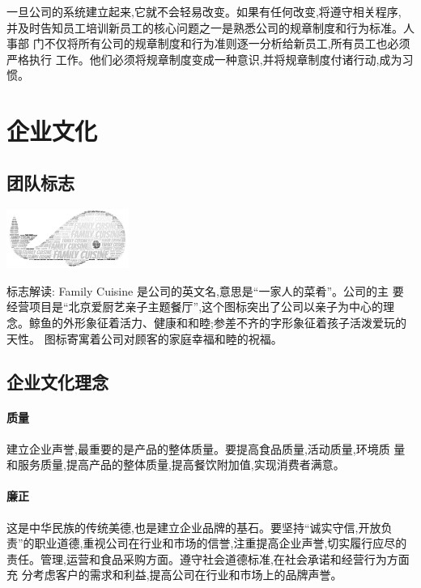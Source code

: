 一旦公司的系统建立起来,它就不会轻易改变。如果有任何改变,将遵守相关程序,
并及时告知员工培训新员工的核心问题之一是熟悉公司的规章制度和行为标准。人事部
门不仅将所有公司的规章制度和行为准则逐一分析给新员工,所有员工也必须严格执行
工作。他们必须将规章制度变成一种意识,并将规章制度付诸行动,成为习惯。

\section{企业文化}
\subsection{团队标志}

\begin{center}
        \label{fig:company-logo}
        \includegraphics[width=0.3\textwidth]{../images/company-logo}
\end{center}

标志解读: Family Cuisine 是公司的英文名,意思是“一家人的菜肴”。公司的主
要经营项目是“北京爱厨艺亲子主题餐厅”,这个图标突出了公司以亲子为中心的理
念。鲸鱼的外形象征着活力、健康和和睦;参差不齐的字形象征着孩子活泼爱玩的天性。
图标寄寓着公司对顾客的家庭幸福和睦的祝福。

\subsection{企业文化理念}
\paragraph{质量}
建立企业声誉,最重要的是产品的整体质量。要提高食品质量,活动质量,环境质
量和服务质量,提高产品的整体质量,提高餐饮附加值,实现消费者满意。

\paragraph{廉正}
这是中华民族的传统美德,也是建立企业品牌的基石。要坚持“诚实守信,开放负
责”的职业道德,重视公司在行业和市场的信誉,注重提高企业声誉,切实履行应尽的
责任。管理,运营和食品采购方面。遵守社会道德标准,在社会承诺和经营行为方面充
分考虑客户的需求和利益,提高公司在行业和市场上的品牌声誉。


